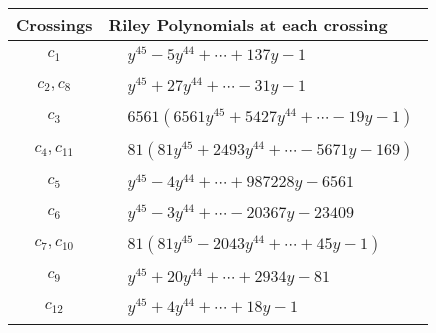 \documentclass[1p]{elsarticle_modified}
\theoremstyle{definition}
\begin{document}
\begin{tabular}{m{50pt}|m{274pt}}
Crossings & \hspace{64pt}Riley Polynomials at each crossing \\
\hline $$\begin{aligned}c_{1}\end{aligned}$$&$\begin{aligned}
&y^{45}-5 y^{44}+\cdots+137 y-1
\end{aligned}$\\
\hline $$\begin{aligned}c_{2},c_{8}\end{aligned}$$&$\begin{aligned}
&y^{45}+27 y^{44}+\cdots-31 y-1
\end{aligned}$\\
\hline $$\begin{aligned}c_{3}\end{aligned}$$&$\begin{aligned}
&6561(6561 y^{45}+5427 y^{44}+\cdots-19 y-1)
\end{aligned}$\\
\hline $$\begin{aligned}c_{4},c_{11}\end{aligned}$$&$\begin{aligned}
&81(81 y^{45}+2493 y^{44}+\cdots-5671 y-169)
\end{aligned}$\\
\hline $$\begin{aligned}c_{5}\end{aligned}$$&$\begin{aligned}
&y^{45}-4 y^{44}+\cdots+987228 y-6561
\end{aligned}$\\
\hline $$\begin{aligned}c_{6}\end{aligned}$$&$\begin{aligned}
&y^{45}-3 y^{44}+\cdots-20367 y-23409
\end{aligned}$\\
\hline $$\begin{aligned}c_{7},c_{10}\end{aligned}$$&$\begin{aligned}
&81(81 y^{45}-2043 y^{44}+\cdots+45 y-1)
\end{aligned}$\\
\hline $$\begin{aligned}c_{9}\end{aligned}$$&$\begin{aligned}
&y^{45}+20 y^{44}+\cdots+2934 y-81
\end{aligned}$\\
\hline $$\begin{aligned}c_{12}\end{aligned}$$&$\begin{aligned}
&y^{45}+4 y^{44}+\cdots+18 y-1
\end{aligned}$\\
\hline
\end{tabular}\\~\\
\end{document}
